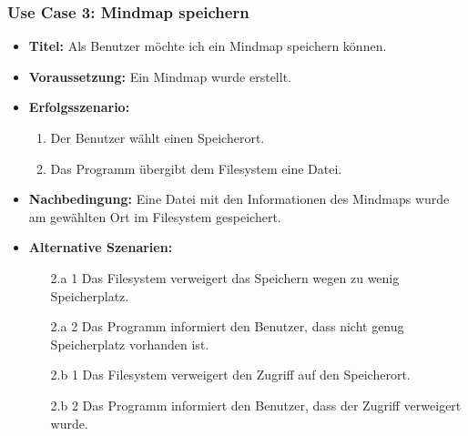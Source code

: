 \subsubsection{Use Case 3: Mindmap speichern}
\begin{itemize}
\item \textbf{Titel:} Als Benutzer möchte ich ein Mindmap speichern können.
\item \textbf{Voraussetzung:} Ein Mindmap wurde erstellt.
\item \textbf{Erfolgsszenario:}
	\begin{enumerate}
	\item Der Benutzer wählt einen Speicherort.
	\item Das Programm übergibt dem Filesystem eine Datei.
	\end{enumerate}
\item \textbf{Nachbedingung:} Eine Datei mit den Informationen des Mindmaps wurde am gewählten Ort im Filesystem gespeichert.
\item \textbf{Alternative Szenarien:}
	\begin{enumerate}
	\item [2.a 1] Das Filesystem verweigert das Speichern wegen zu wenig Speicherplatz.
	\item [2.a 2] Das Programm informiert den Benutzer, dass nicht genug Speicherplatz vorhanden ist.
	\item []
	\item [2.b 1] Das Filesystem verweigert den Zugriff auf den Speicherort.
	\item [2.b 2] Das Programm informiert den Benutzer, dass der Zugriff verweigert wurde.
	\end{enumerate}
\end{itemize}

